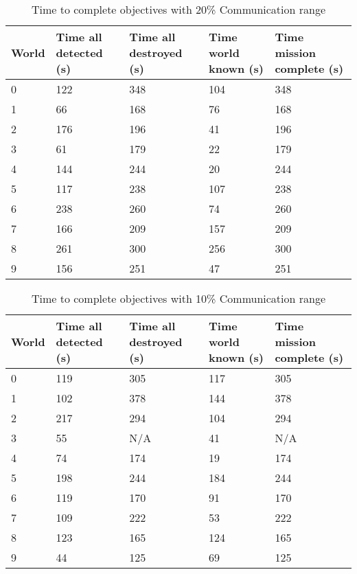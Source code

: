\begin{table}[H]
	\caption{Time to complete objectives with 20\% Communication range}
	\centering
	\label{tab:comm20}
	
	\begin{tabular}{|p{1cm}|p{1.5cm}|p{1.75cm}|p{1.5cm}|p{1.5cm}|}
		\hline
		World & Time all detected (s) & Time all destroyed (s) & Time world known (s) & Time mission complete (s) \\
		\hline
		0&122&348&104&348 \\ \hline
		1&66&168&76&168 \\ \hline
		2&176&196&41&196 \\ \hline
		3&61&179&22&179 \\ \hline
		4&144&244&20&244 \\ \hline
		5&117&238&107&238 \\ \hline
		6&238&260&74&260 \\ \hline
		7&166&209&157&209 \\ \hline
		8&261&300&256&300 \\ \hline
		9&156&251&47&251 \\ \hline
	\end{tabular}
\end{table}

\begin{table}[H]
	\caption{Time to complete objectives with 10\% Communication range}
	\centering
	\label{tab:comm10}
	
	\begin{tabular}{|p{1cm}|p{1.5cm}|p{1.75cm}|p{1.5cm}|p{1.5cm}|}
		\hline
		World & Time all detected (s) & Time all destroyed (s) & Time world known (s) & Time mission complete (s) \\
		\hline
		0&119&305&117&305 \\ \hline
		1&102&378&144&378 \\ \hline
		2&217&294&104&294 \\ \hline
		3&55&N/A&41&N/A\\ \hline
		4&74&174&19&174 \\ \hline
		5&198&244&184&244 \\ \hline
		6&119&170&91&170 \\ \hline
		7&109&222&53&222 \\ \hline
		8&123&165&124&165 \\ \hline
		9&44&125&69&125 \\ \hline

	\end{tabular}
\end{table}


